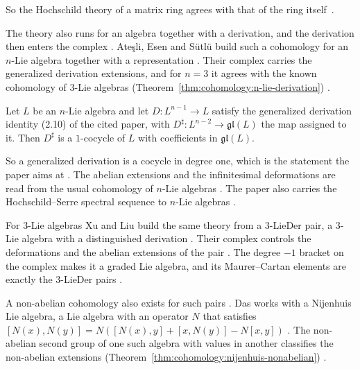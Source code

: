 So the Hochschild theory of a matrix ring agrees with that of the ring
itself~\cite[Theorem~9.5.6, p.~328]{Weibel1994}.

The theory also runs for an algebra together with a derivation, and the
derivation then enters the complex \cite[p.~2]{AtesliEsenSutlu2021}.
Ate\c{s}li, Esen and S\"utl\"u build such a cohomology for an $n$-Lie algebra
together with a representation \cite[p.~2]{AtesliEsenSutlu2021}. Their complex
carries the generalized derivation extensions, and for $n=3$ it agrees with
the known cohomology of $3$-Lie algebras
(Theorem~\ref{thm:cohomology:n-lie-derivation})
\cite[p.~1]{AtesliEsenSutlu2021}.

\begin{theorem}\label{thm:cohomology:n-lie-derivation}
Let $L$ be an $n$-Lie algebra and let $D\colon L^{n-1}\to L$ satisfy the
generalized derivation identity (2.10) of the cited paper, with
$D^{\sharp}\colon L^{n-2}\to\mathfrak{gl}(L)$ the map assigned to it. Then
$D^{\sharp}$ is a $1$-cocycle of $L$ with coefficients in
$\mathfrak{gl}(L)$.
\end{theorem}

So a generalized derivation is a cocycle in degree one, which is the
statement the paper aims at \cite[p.~2]{AtesliEsenSutlu2021}. The abelian
extensions and the infinitesimal deformations are read from the usual
cohomology of $n$-Lie algebras \cite[p.~1]{AtesliEsenSutlu2021}. The paper
also carries the Hochschild--Serre spectral sequence to $n$-Lie algebras
\cite[p.~1]{AtesliEsenSutlu2021}.

For $3$-Lie algebras Xu and Liu build the same theory from a $3$-LieDer pair,
a $3$-Lie algebra with a distinguished derivation
\cite[p.~1]{XuLiu2021ThreeLieDer}. Their complex controls the deformations
and the abelian extensions of the pair
\cite[p.~1]{XuLiu2021ThreeLieDer}. The degree $-1$ bracket on the complex
makes it a graded Lie algebra, and its Maurer--Cartan elements are exactly
the $3$-LieDer pairs \cite[p.~2]{XuLiu2021ThreeLieDer}.

A non-abelian cohomology also exists for such pairs \cite[Definition~2.1,
p.~3]{Das2025Nijenhuis}. Das works with a Nijenhuis Lie algebra, a Lie algebra
with an operator $N$ that satisfies $[N(x),N(y)]=N([N(x),y]+[x,N(y)]-N[x,y])$
\cite[Definition~2.1, p.~3]{Das2025Nijenhuis}. The non-abelian second group of
one such algebra with values in another classifies the non-abelian extensions
(Theorem~\ref{thm:cohomology:nijenhuis-nonabelian})
\cite[p.~2]{Das2025Nijenhuis}.


